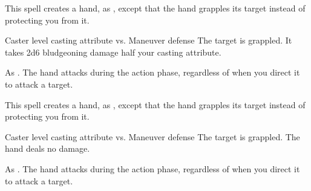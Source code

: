 \begin{spellheader}
\end{spellheader}
\begin{spellcontent}
    \begin{spelltargetinginfo}
    \end{spelltargetinginfo}
    \begin{spelleffects}
        \spelleffect This spell creates a hand, as , except that the hand grapples its target instead of protecting you from it.
        \begin{spellattack}{Caster level \add casting attribute vs. Maneuver defense}
            \spellsuccess The target is grappled. It takes 2d6 bludgeoning damage \add half your casting attribute.
        \end{spellattack}
        \spelldur{\durshort \dismissable}
    \end{spelleffects}
\end{spellcontent}
\begin{spellfooter}
    \spellnotes As . The hand attacks during the action phase, regardless of when you direct it to attack a target.
\end{spellfooter}

\begin{spellheader}
\end{spellheader}
\begin{spellcontent}
    \begin{spelltargetinginfo}
    \end{spelltargetinginfo}
    \begin{spelleffects}
        \spelleffect This spell creates a hand, as , except that the hand grapples its target instead of protecting you from it.
        \begin{spellattack}{Caster level \add casting attribute vs. Maneuver defense}
            \spellsuccess The target is grappled. The hand deals no damage.
        \end{spellattack}
        \spelldur{\durshort \dismissable}
    \end{spelleffects}
\end{spellcontent}
\begin{spellfooter}
    \spellnotes As . The hand attacks during the action phase, regardless of when you direct it to attack a target.
\end{spellfooter}

